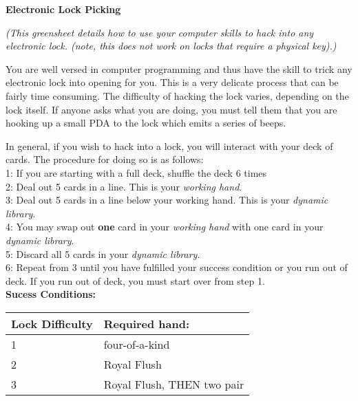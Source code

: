 \documentclass[green]{guildcamp1}
\begin{document}
\name{\gHacking{}}

\textbf{Electronic Lock Picking}

\emph{(This greensheet details how to use your computer skills to hack into any electronic lock. (note, this does not work on locks that require a physical key).)}

You are well versed in computer programming and thus have the skill to trick any electronic lock into opening for you.  This is a very delicate process that can be fairly time consuming. The difficulty of hacking the lock varies, depending on the lock itself. If anyone asks what you are doing, you must tell them that you are hooking up a small PDA to the lock which emits a series of beeps.

In general, if you wish to hack into a lock, you will interact with your deck of cards. The procedure for doing so is as follows:\\
1: If you are starting with a full deck, shuffle the deck 6 times\\
2: Deal out 5 cards in a line. This is your {\em working hand}.\\
3: Deal out 5 cards in a line below your working hand. This is your {\em dynamic library}.\\
4: You may swap out {\bf one} card in your {\em working hand} with one card in your {\em dynamic library}.\\
5: Discard all 5 cards in your {\em dynamic library}.\\
6: Repeat from 3 until you have fulfilled your success condition or you run out of deck.  If you run out of deck, you must start over from step 1.\\

{\bf Sucess Conditions:}
\begin{tabular}{||l|l||}
\hline\hline
Lock Difficulty	& Required hand:\\
\hline
1	& four-of-a-kind\\
2	& Royal Flush\\
3	& Royal Flush, THEN two pair\\
\hline\hline
\end{tabular}
\end{document}
